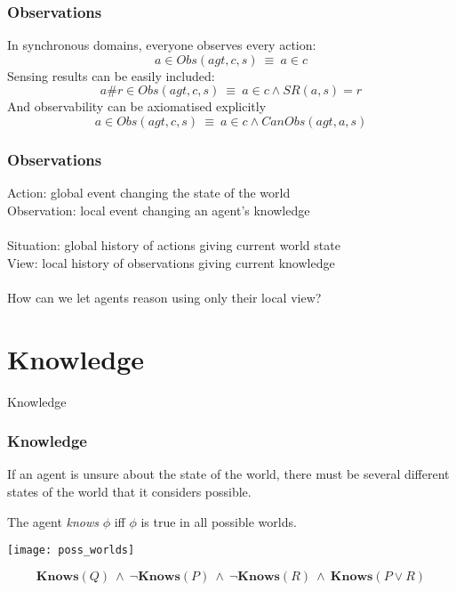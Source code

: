 \documentclass{beamer}
\begin{document}
\begin{frame}
\frametitle{Observations}
In synchronous domains, everyone observes every action:
\begin{equation*}
a \in Obs(agt,c,s)\ \equiv\ a \in c
\end{equation*}
\pause
Sensing results can be easily included:
\begin{equation*}
a\#r \in Obs(agt,c,s)\ \equiv\ a \in c \wedge SR(a,s)=r
\end{equation*}
\pause
And observability can be axiomatised explicitly
\begin{equation*}
a \in Obs(agt,c,s)\ \equiv\ a \in c \wedge CanObs(agt,a,s)
\end{equation*}
\end{frame}

\begin{frame}
\frametitle{Observations}
Action:  global event changing the state of the world\\
Observation:  local event changing an agent's knowledge
\ \\
\ \\
Situation:  global history of actions giving current world state\\
View:  local history of observations giving current knowledge
\ \\
\ \\
\pause
How can we let agents reason using only their local view?
\end{frame}

\section{Knowledge}

\begin{frame}
\centering \large Knowledge\\
\end{frame}


\begin{frame}
\frametitle{Knowledge}
If an agent is unsure about the state of the world, there must be several
different states of the world that it considers possible.

The agent \emph{knows} $\phi$ iff $\phi$ is true in all possible worlds.
\begin{center}
  \texttt{[image: poss\_worlds]}
\end{center}
\begin{equation*}
\mathbf{Knows}(Q)\ \wedge\ \neg\mathbf{Knows}(P)\ \wedge\ \neg\mathbf{Knows}(R)\ \wedge\ \mathbf{Knows}(P \vee R)
\end{equation*}

\end{frame}
\end{document}
